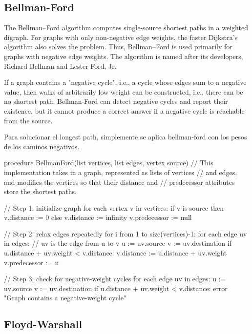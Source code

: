 \documentclass[10pt,letterpaper,twocolumn,twosided]{article}
\newcommand{\codigofuente}[1]{

\dotfill
}
\begin{document}
\codigofuente{../src/dijkstra.${EXT}}


\subsection{Bellman-Ford}

The Bellman–Ford algorithm computes single-source shortest paths in a weighted digraph. For graphs with only non-negative edge weights, the faster Dijkstra's algorithm also solves the problem. Thus, Bellman–Ford is used primarily for graphs with negative edge weights. The algorithm is named after its developers, Richard Bellman and Lester Ford, Jr.

If a graph contains a "negative cycle", i.e., a cycle whose edges sum to a negative value, then walks of arbitrarily low weight can be constructed, i.e., there can be no shortest path. Bellman-Ford can detect negative cycles and report their existence, but it cannot produce a correct answer if a negative cycle is reachable from the source.

Para solucionar el longest path, simplemente se aplica bellman-ford con los pesos de los caminos negativos.

procedure BellmanFord(list vertices, list edges, vertex source)
   // This implementation takes in a graph, represented as lists of vertices
   // and edges, and modifies the vertices so that their distance and
   // predecessor attributes store the shortest paths.

   // Step 1: initialize graph
   for each vertex v in vertices:
       if v is source then v.distance := 0
       else v.distance := infinity
       v.predecessor := null

   // Step 2: relax edges repeatedly
   for i from 1 to size(vertices)-1:
       for each edge uv in edges: // uv is the edge from u to v
           u := uv.source
           v := uv.destination
           if u.distance + uv.weight < v.distance:
               v.distance := u.distance + uv.weight
               v.predecessor := u

   // Step 3: check for negative-weight cycles
   for each edge uv in edges:
       u := uv.source
       v := uv.destination
       if u.distance + uv.weight < v.distance:
           error "Graph contains a negative-weight cycle"


\subsection{Floyd-Warshall}
\end{document}
